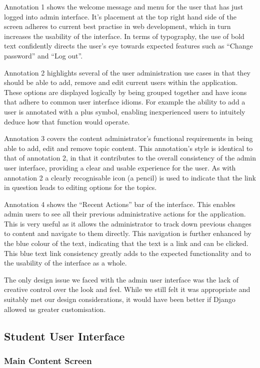 \documentclass{l3proj}
\begin{document}
Annotation 1 shows the welcome message and menu for the user that has just logged into admin interface. It's placement at the top right hand side of the screen adheres to current best practise in web development, which in turn increases the usability of the interface. In terms of typography, the use of bold text confidently directs the user's eye towards expected features such as ``Change password'' and ``Log out''.

Annotation 2 highlights several of the user administration use cases in that they should be able to add, remove and edit current users within the application. These options are displayed logically by being grouped together and have icons that adhere to common user interface idioms. For example the ability to add a user is annotated with a plus symbol, enabling inexperienced users to intuitely deduce how that function would operate. 

Annotation 3 covers the content administrator's functional requirements in being able to add, edit and remove topic content. This annotation's style is identical to that of annotation 2, in that it contributes to the overall consistency of the admin user interface, providing a clear and usable experience for the user. As with annotation 2 a clearly recognisable icon (a pencil) is used to indicate that the link in question leads to editing options for the topics. 

Annotation 4 shows the ``Recent Actions'' bar of the interface. This enables admin users to see all their previous administrative actions for the application. This is very useful as it allows the administrator to track down previous changes to content and navigate to them directly. This navigation is further enhanced by the blue colour of the text, indicating that the text is a link and can be clicked. This blue text link consistency greatly adds to the expected functionality and to the usability of the interface as a whole.

The only design issue we faced with the admin user interface was the lack of creative control over the look and feel. While we still felt it was appropriate and suitably met our design considerations, it would have been better if Django allowed us greater customisation.

\subsection{Student User Interface}

\subsubsection{Main Content Screen}
\end{document}
